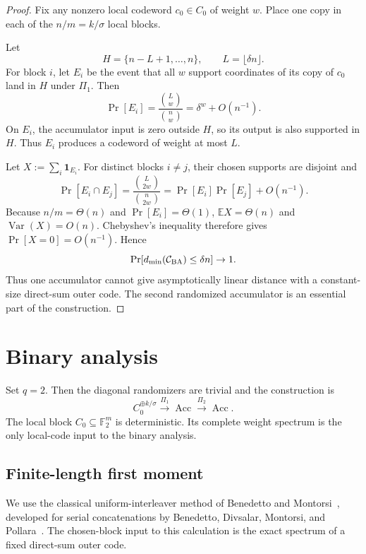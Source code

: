 \documentclass[runningheads,envcountsame,envcountsect]{llncs}
\newcommand{\F}{\mathbb F}
\newcommand{\Acc}{\operatorname{Acc}}
\newcommand{\E}{\mathbb E}
\newcommand{\Prb}{\Pr}
\newcommand{\cC}{\mathcal C}
\begin{document}
\begin{proof}
Fix any nonzero local codeword $c_0\in C_0$ of weight $w$.
Place one copy in each of the $n/m=k/\sigma$ local blocks.

Let
\[
    H=\{n-L+1,\ldots,n\},
    \qquad L=\lfloor\delta n\rfloor .
\]
For block $i$, let $E_i$ be the event that all $w$ support coordinates of its
copy of $c_0$ land in $H$ under $\Pi_1$.  Then
\[
    \Prb[E_i]
      =
    \frac{\binom{L}{w}}{\binom{n}{w}}
      =
    \delta^w+O(n^{-1}).
\]
On $E_i$, the accumulator input is zero outside $H$, so its output is also
supported in $H$.  Thus $E_i$ produces a codeword of weight at most $L$.

Let $X:=\sum_i\mathbf 1_{E_i}$.  For distinct blocks $i\ne j$, their chosen
supports are disjoint and
\[
    \Prb[E_i\cap E_j]
      =
    \frac{\binom{L}{2w}}{\binom{n}{2w}}
      =
    \Prb[E_i]\Prb[E_j]+O(n^{-1}).
\]
Because $n/m=\Theta(n)$ and $\Prb[E_i]=\Theta(1)$,
$\E X=\Theta(n)$ and $\operatorname{Var}(X)=O(n)$.  Chebyshev's inequality
therefore gives $\Prb[X=0]=O(n^{-1})$.  Hence
\[
    \Prb[d_{\min}(\cC_{\rm BA})\le \delta n]\to 1.
\]
Thus one accumulator cannot give asymptotically linear distance with a
constant-size direct-sum outer code.  The second randomized accumulator is an
essential part of the construction.
\end{proof}


\section{Binary analysis}
\label{sec:binary}

Set $q=2$.  Then the diagonal randomizers are trivial and the construction is
\[
    \boxed{
    C_0^{\oplus k/\sigma}
      \xrightarrow{\Pi_1}
    \Acc
      \xrightarrow{\Pi_2}
    \Acc .
    }
\]
The local block $C_0\subseteq\F_2^m$ is deterministic.  Its complete weight
spectrum is the only local-code input to the binary analysis.

\subsection{Finite-length first moment}

We use the classical uniform-interleaver method of Benedetto and
Montorsi~\cite{benedetto96}, developed for serial concatenations by Benedetto,
Divsalar, Montorsi, and Pollara~\cite{benedetto98}.  The chosen-block input to
this calculation is the exact spectrum of a fixed direct-sum outer code.
\end{document}
